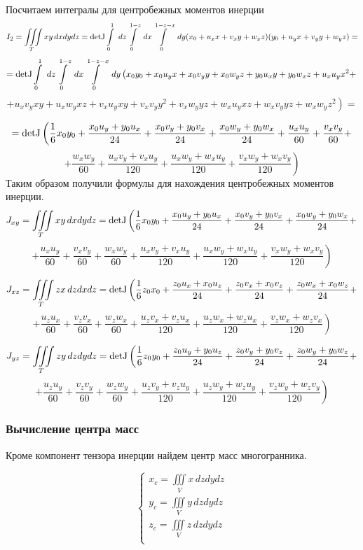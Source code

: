 \documentclass[a4paper,12pt, titlepage]{article}
\begin{document}
Посчитаем интегралы для центробежных моментов инерции
$$I_{2} = \iiint \limits_T xy \,dxdydz = {\rm detJ} \int \limits_{0}^{1}~dz \int \limits_{0}^{1-z}~dx \int \limits_{0}^{1-z-x}~dy
(x_0 + u_x x + v_x y + w_x z)(y_0 + u_y x + v_y y + w_y z) = $$
$$
 = {\rm detJ} \int \limits_{0}^{1}~dz \int \limits_{0}^{1-z}~dx \int \limits_{0}^{1-z-x}~dy
\left(
x_0 y_0 + x_0 u_y x + x_0 v_y y + x_0 w_y z + y_0 u_x y + y_0 w_x z
+ u_x u_y x^2 +
\right.
$$
$$
\left.
+ u_x v_y xy + u_x w_y xz + v_x u_y xy + v_x v_y y^2 + v_x w_y yz 
+ w_x u_y xz + w_x v_y yz + w_x w_y z^2
\right) = 
$$

$$
 = {\rm detJ}\left(
\frac{1}{6} x_0 y_0 + \frac{x_0 u_y + y_0 u_x}{24} + \frac{x_0 v_y + y_0 v_x}{24} + \frac{x_0 w_y + y_0 w_x}{24}
+ \frac{u_x u_y}{60} + \frac{v_x v_y}{60} +
\right.
$$
$$
\left.
+  \frac{w_x w_y}{60}
+ \frac{u_x v_y + v_x u_y}{120} + \frac{u_x w_y + w_x u_y}{120} + \frac{v_x w_y + w_x v_y}{120}
\right) 
$$			
\newpage
Таким образом получили формулы для нахождения центробежных моментов инерции.  
$$
J_{xy} = \iiint \limits_T xy \,dxdydz = {\rm detJ}\left(
\frac{1}{6} x_0 y_0 + \frac{x_0 u_y + y_0 u_x}{24} + \frac{x_0 v_y + y_0 v_x}{24} + \frac{x_0 w_y + y_0 w_x}{24}
+
\right.
$$
$$
\left.
+ \frac{u_x u_y}{60} + \frac{v_x v_y}{60} +  \frac{w_x w_y}{60}
+ \frac{u_x v_y + v_x u_y}{120} + \frac{u_x w_y + w_x u_y}{120} + \frac{v_x w_y + w_x v_y}{120}
\right) 
$$		

$$
J_{xz} = \iiint \limits_T zx \,dzdxdz = {\rm detJ}\left(
\frac{1}{6} z_0 x_0 + \frac{z_0 u_x + x_0 u_z}{24} + \frac{z_0 v_x + x_0 v_z}{24} + \frac{z_0 w_x + x_0 w_z}{24}
+
\right.
$$
$$
\left.
+ \frac{u_z u_x}{60} + \frac{v_z v_x}{60} +  \frac{w_z w_x}{60}
+ \frac{u_z v_x + v_z u_x}{120} + \frac{u_z w_x + w_z u_x}{120} + \frac{v_z w_x + w_z v_x}{120}
\right) 
$$	

$$
J_{yz} = \iiint \limits_T zy \,dzdydz = {\rm detJ}\left(
\frac{1}{6} z_0 y_0 + \frac{z_0 u_y + y_0 u_z}{24} + \frac{z_0 v_y + y_0 v_z}{24} + \frac{z_0 w_y + y_0 w_z}{24}
+
\right.
$$
$$
\left.
+ \frac{u_z u_y}{60} + \frac{v_z v_y}{60} +  \frac{w_z w_y}{60}
+ \frac{u_z v_y + v_z u_y}{120} + \frac{u_z w_y + w_z u_y}{120} + \frac{v_z w_y + w_z v_y}{120}
\right) 
$$	
\subsubsection{Вычисление центра масс}
Кроме компонент тензора инерции найдем центр масс многогранника.

\[
 	\left\{
 		\begin{aligned}
			x_c = \iiint \limits_V x \,dzdydz\\
			y_c = \iiint \limits_V y \,dzdydz\\
			z_c = \iiint \limits_V z \,dzdydz\\
		\end{aligned}
	\right.
\]
\end{document}
